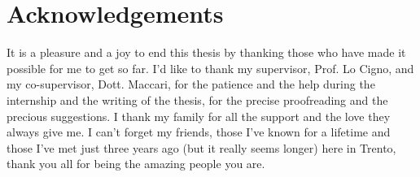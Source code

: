 \documentclass[a4paper,11pt,twoside,openright]{memoir}
\begin{document}
\section{Acknowledgements}\label{acknowledgements}

It is a pleasure and a joy to end this thesis by thanking those who have made
it possible for me to get so far.
I'd like to thank my supervisor, Prof. Lo Cigno, and my co-supervisor, Dott.
Maccari, for the patience and the help during the internship and the writing of
the thesis, for the precise proofreading and the precious suggestions.
I thank my family for all the support and the love they always give me.
I can't forget my friends, those I've known for a lifetime and those I've met
just three years ago (but it really seems longer) here in Trento, thank you
all for being the amazing people you are.


 
\end{document}

